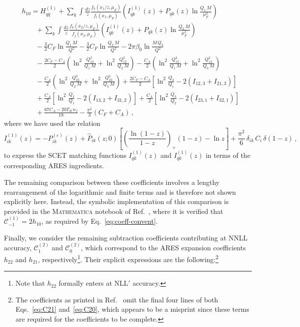 \begin{equation}
\begin{aligned}
&h_{10}=H_{q\bar{q}}^{(1)}+\sum_{k}\int\frac{dz}{z} \frac{f_k(x_1/z,\mu_F)}{f_i(x_1,\mu_F)}\left(I_{qk}^{(1)}(z)+P_{qk}(z)\ln\frac{Q_1\,M}{\mu_F^2}\right)\\[0.5ex]
&\qquad+\sum_{k}\int\frac{dz}{z} \frac{f_k(x_2/z,\mu_F)}{f_j(x_2,\mu_F)}\left(I_{\bar{q}k}^{(1)}(z)+P_{\bar{q}k}(z)\ln\frac{Q_2\,M}{\mu_F^2}\right)\\[0.5ex]
&\qquad-\frac{3}{2}C_F\ln\frac{Q_1\,M}{Q^2}-\frac{3}{2}C_F\ln\frac{Q_2\,M}{Q^2}-2\pi\beta_0\ln\frac{M\,Q_3}{Q^2}\\[0.5ex]
    &\qquad-\frac{2C_F-C_A}{2}\left(\ln^2\frac{Q_{12}^2}{Q_1\,M}+\ln^2\frac{Q_{12}^2}{Q_2\,M}\right)-\frac{C_A}{2}\left(\ln^2\frac{Q_{13}^2}{Q_1\,M}+\ln^2\frac{Q_{13}^2}{Q_3\,M}\right)\\[0.5ex]
&\qquad-\frac{C_A}{2}\left(\ln^2\frac{Q_{23}^2}{Q_2\,M}+\ln^2\frac{Q_{23}^2}{Q_3\,M}\right)+\frac{2C_F-C_A}{2}\left[\ln^2\frac{Q_2}{Q_1}-2(I_{12,3}+I_{21,3})\right]\\[0.5ex]
&\qquad+\frac{C_A}{2}\left[\ln^2\frac{Q_3}{Q_1}-2(I_{13,2}+I_{31,2})\right]+\frac{C_A}{2}\left[\ln^2\frac{Q_3}{Q_2}-2(I_{23,1}+I_{32,1})\right]\\[0.5ex]
&\qquad +\frac{67C_A-20 T_R\,n_f}{18}-\frac{\pi^2}{3}(C_F+C_A)\,,
\end{aligned}
\end{equation}
where we have used the relation
\begin{equation}
\label{eq:I1-ARES}
I_{ik}^{(1)}(z) =
-{P}_{ik}^{(\varepsilon)}(z)
+\hat{P}_{ik}(z;0)\!\left[
\left(\frac{\ln(1-z)}{1-z}\right)_{\!\!+}(1-z)
-\ln z\right]
+\frac{\pi^2}{6}\,\delta_{ik}\,C_i\,\delta(1-z)\,,
\end{equation}
to express the SCET matching functions $I_{qk}^{(1)}(z)$ and
$I_{\bar{q}k}^{(1)}(z)$ in terms of the corresponding \textsc{ARES}
ingredients.

The remaining comparison between these coefficients involves a lengthy rearrangement of
the logarithmic and finite terms and is therefore not shown explicitly
here. Instead, the symbolic implementation of this comparison is provided
in the \textsc{Mathematica} notebook of Ref.~\cite{peake2026validation},
where it is verified that $\mathcal{C}^{(1)}_{-1}=2h_{10}$, as required by Eq.~\eqref{eq:coeff-convent}.

Finally, we consider the remaining subtraction coefficients contributing
at NNLL accuracy, $\mathcal{C}^{(2)}_1$ and $\mathcal{C}^{(2)}_0$, which
correspond to the \textsc{ARES} expansion coefficients $h_{22}$ and
$h_{21}$, respectively\footnote{Note that $h_{22}$ formally enters at
NLL$'$ accuracy.}. Their explicit expressions are the following:\footnote{The coefficients as printed in
Ref.~\cite{Gaunt:2015pea} omit the final four lines of both
Eqs.~\eqref{eq:C21} and~\eqref{eq:C20}, which appears to be a misprint since
these terms are required for the coefficients to be complete.}

